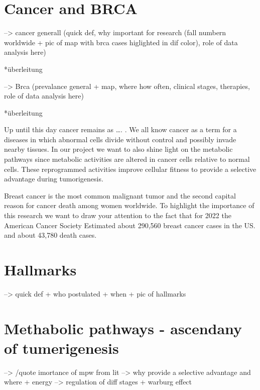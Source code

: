 \documentclass[
  parskip,
  oneside]{scrreprt}
\begin{document}
\hypertarget{cancer-and-brca}{%
\section{Cancer and BRCA}\label{cancer-and-brca}}

--\textgreater{} cancer generall (quick def, why important for research
(fall numbern worldwide + pic of map with brca cases higlighted in dif
color), role of data analysis here)

*überleitung

--\textgreater{} Brca (prevalance general + map, where how often,
clinical stages, therapies, role of data analysis here)

*überleitung

Up until this day cancer remains as \ldots. . We all know cancer as a
term for a diseases in which abnormal cells divide without control and
possibly invade nearby tissues. In our project we want to also shine
light on the metabolic pathways since metabolic activities are altered
in cancer cells relative to normal cells. These reprogrammed activities
improve cellular fitness to provide a selective advantage during
tumorigenesis.

Breast cancer is the most common malignant tumor and the second capital
reason for cancer death among women worldwide. To highlight the
importance of this research we want to draw your attention to the fact
that for 2022 the American Cancer Society Estimated about 290,560 breast
cancer cases in the US. and about 43,780 death cases.

\hypertarget{hallmarks}{%
\section{Hallmarks}\label{hallmarks}}

--\textgreater{} quick def + who postulated + when + pic of hallmarks

\hypertarget{methabolic-pathways---ascendany-of-tumerigenesis}{%
\section{Methabolic pathways - ascendany of
tumerigenesis}\label{methabolic-pathways---ascendany-of-tumerigenesis}}

--\textgreater{} /quote imortance of mpw from lit --\textgreater{} why
provide a selective advantage and where + energy --\textgreater{}
regulation of diff stages + warburg effect
\end{document}
